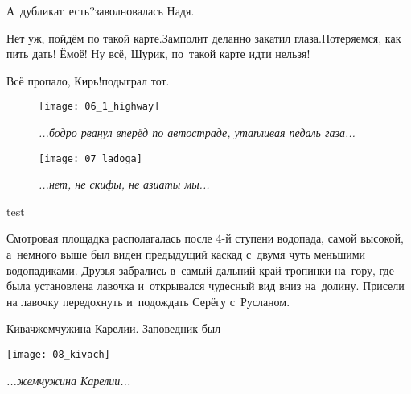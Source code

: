 \diagdash А~дубликат~есть?\mdash заволновалась Надя.

\diagdash Нет уж, пойдём по такой карте.\mdash Замполит деланно закатил глаза.\mdash Потеряемся, как пить дать! Ё\sdash моё! Ну всё, Шурик, по~такой карте идти нельзя! 

\diagdash Всё пропало, Кирь!\mdash подыграл тот.





\newpage

\begin{figure}[h]
	\centering
	\texttt{[image: 06\_1\_highway]}
	\caption{\small\textit{...бодро рванул вперёд по автостраде, утапливая педаль газа...}}
\end{figure}

\newpage

\begin{figure}[h]
	\centering
	\texttt{[image: 07\_ladoga]}
	\caption{\small\textit{...нет, не скифы, не азиаты мы...}}
\end{figure}

\newpage

test

\noindent
\begin{minipage}{0.45\textwidth}
	\setlength{\parindent}{1.0cm}  %
	
	\indent Смотровая площадка располагалась после 4-й ступени водопада, самой высокой, а~немного выше был виден предыдущий каскад с~двумя чуть меньшими водопадиками. Друзья забрались в~самый дальний край тропинки на~гору, где была установлена лавочка и~открывался чудесный вид вниз на~долину. Присели на лавочку передохнуть и~подождать Серёгу с~Русланом.
	
	\indent Кивач\mdash жемчужина Карелии. Заповедник был 
\end{minipage}\hfill
\begin{minipage}{0.5\textwidth}
	\centering
	\texttt{[image: 08\_kivach]}
	
	{\small\textit{...жемчужина Карелии...}}
\end{minipage}

